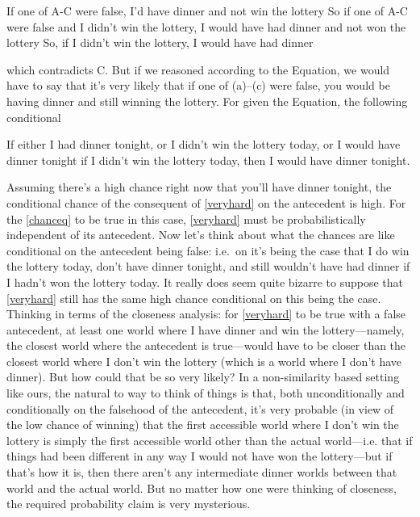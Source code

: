 \documentclass[If.tex]{subfiles}
\begin{document}
If one of A-C were false, I'd have dinner and not win the lottery
So if one of A-C were false and I didn't win the lottery, I would have had dinner and not won the lottery
So, if I didn't win the lottery, I would have had dinner

which contradicts C.  But if we reasoned according to the Equation, we would have to say that it's very likely that if one of (a)--(c) were false, you would be having dinner and still winning the lottery.  For given the Equation, the following conditional
\begin{prop}
	\nitem \label{veryhard}
	If either I had dinner tonight, or I didn't win the lottery today, or I would have dinner tonight if I didn't win the lottery today, then I would have dinner tonight.  
\end{prop}
Assuming there's a high chance right now that you'll have dinner tonight, the conditional chance of the consequent of \ref{veryhard} on the antecedent is high.  For the \ref{chanceq} to be true in this case, \ref{veryhard} must be probabilistically independent of its antecedent.  Now let's think about what the chances are like conditional on the antecedent being false: i.e.\ on it's being the case that I do win the lottery today, don't have dinner tonight, and still wouldn't have had dinner if I hadn't won the lottery today.  It really does seem quite bizarre to suppose that \ref{veryhard} still has the same high chance conditional on this being the case.  Thinking in terms of the closeness analysis: for \ref{veryhard} to be true with a false antecedent, at least one world where I have dinner and win the lottery---namely, the closest world where the antecedent is true---would have to be closer than the closest world where I don't win the lottery (which is a world where I don't have dinner).  But how could that be so very likely?  In a non-similarity based setting like ours, the natural to way to think of things is that, both unconditionally and conditionally on the falsehood of the antecedent, it's very probable (in view of the low chance of winning) that the first accessible world where I don't win the lottery is simply the first accessible world other than the actual world---i.e. that if things had been different in any way I would not have won the lottery---but if that's how it is, then there aren't any intermediate dinner worlds between that world and the actual world.  But no matter how one were thinking of closeness, the required probability claim is very mysterious.  
\end{document}
